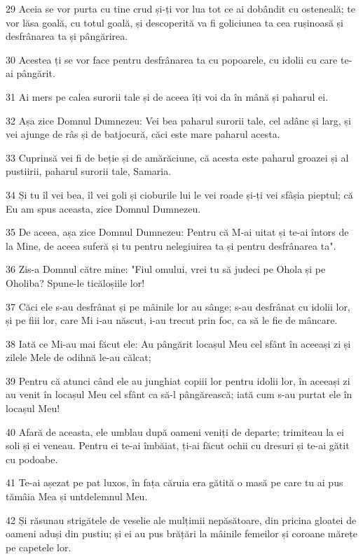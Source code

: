 \par 29 Aceia se vor purta cu tine crud și-ți vor lua tot ce ai dobândit cu osteneală; te vor lăsa goală, cu totul goală, și descoperită va fi goliciunea ta cea rușinoasă și desfrânarea ta și pângărirea.
\par 30 Acestea ți se vor face pentru desfrânarea ta cu popoarele, cu idolii cu care te-ai pângărit.
\par 31 Ai mers pe calea surorii tale și de aceea îți voi da în mână și paharul ei.
\par 32 Așa zice Domnul Dumnezeu: Vei bea paharul surorii tale, cel adânc și larg, și vei ajunge de râs și de batjocură, căci este mare paharul acesta.
\par 33 Cuprinsă vei fi de beție și de amărăciune, că acesta este paharul groazei și al pustiirii, paharul surorii tale, Samaria.
\par 34 Și tu îl vei bea, îl vei goli și cioburile lui le vei roade și-ți vei sfâșia pieptul; că Eu am spus aceasta, zice Domnul Dumnezeu.
\par 35 De aceea, așa zice Domnul Dumnezeu: Pentru că M-ai uitat și te-ai întors de la Mine, de aceea suferă și tu pentru nelegiuirea ta și pentru desfrânarea ta".
\par 36 Zis-a Domnul către mine: "Fiul omului, vrei tu să judeci pe Ohola și pe Oholiba? Spune-le ticăloșiile lor!
\par 37 Căci ele s-au desfrânat și pe mâinile lor au sânge; s-au desfrânat cu idolii lor, și pe fiii lor, care Mi i-au născut, i-au trecut prin foc, ca să le fie de mâncare.
\par 38 Iată ce Mi-au mai făcut ele: Au pângărit locașul Meu cel sfânt în aceeași zi și zilele Mele de odihnă le-au călcat;
\par 39 Pentru că atunci când ele au junghiat copiii lor pentru idolii lor, în aceeași zi au venit în locașul Meu cel sfânt ca să-l pângărească; iată cum s-au purtat ele în locașul Meu!
\par 40 Afară de aceasta, ele umblau după oameni veniți de departe; trimiteau la ei soli și ei veneau. Pentru ei te-ai îmbăiat, ți-ai făcut ochii cu dresuri și te-ai gătit cu podoabe.
\par 41 Te-ai așezat pe pat luxos, în fața căruia era gătită o masă pe care tu ai pus tămâia Mea și untdelemnul Meu.
\par 42 Și răsunau strigătele de veselie ale mulțimii nepăsătoare, din pricina gloatei de oameni aduși din pustiu; și ei au pus brățări la mâinile femeilor și coroane mărețe pe capetele lor.
